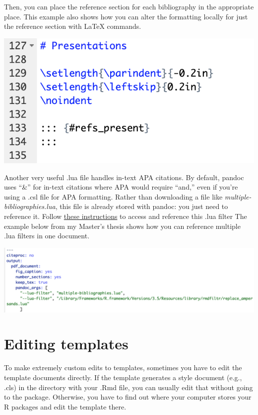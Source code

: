 \documentclass[
  openany]{book}
\begin{document}
Then, you can place the reference section for each bibliography in the appropriate place. This example also shows how you can alter the formatting locally for just the reference section with LaTeX commands.

\includegraphics[width=\textwidth]{images/references_placement}

Another very useful .lua file handles in-text APA citations. By default, pandoc uses ``\&'' for in-text citations where APA would require ``and,'' even if you're using a .csl file for APA formatting. Rather than downloading a file like \emph{multiple-bibliographies.lua}, this file is already stored with pandoc: you just need to reference it. Follow \href{https://cran.rstudio.com/web/packages/rmdfiltr/vignettes/replace_ampersands.html}{these instructions} to access and reference this .lua filter The example below from my Master's thesis shows how you can reference multiple .lua filters in one document.

\includegraphics[width=\textwidth]{images/lua_example}

\hypertarget{editing-templates}{%
\section{Editing templates}\label{editing-templates}}

To make extremely custom edits to templates, sometimes you have to edit the template documents directly. If the template generates a style document (e.g., .cls) in the directory with your .Rmd file, you can usually edit that without going to the package. Otherwise, you have to find out where your computer stores your R packages and edit the template there.
\end{document}
